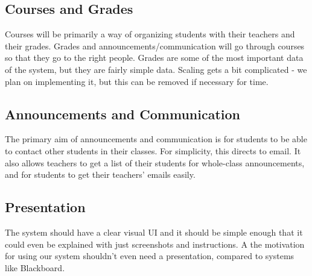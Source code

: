 \documentclass{article}
\begin{document}
\subsection{Courses and Grades}

Courses will be primarily a way of organizing students with their teachers and
their grades. Grades and announcements/communication will go through courses so
that they go to the right people. Grades are some of the most important data of
the system, but they are fairly simple data. Scaling gets a bit complicated -
we plan on implementing it, but this can be removed if necessary for time.

\subsection{Announcements and Communication}

The primary aim of announcements and communication is for students to be able
to contact other students in their classes. For simplicity, this directs to
email. It also allows teachers to get a list of their students for whole-class
announcements, and for students to get their teachers' emails easily.

\subsection{Presentation}

The system should have a clear visual UI and it should be simple enough that it
could even be explained with just screenshots and instructions. A the
motivation for using our system shouldn't even need a presentation, compared to
systems like Blackboard.

{} 
\end{document}
